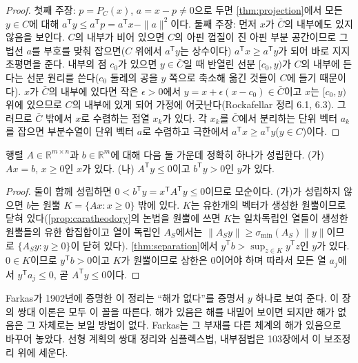 \begin{proof}
첫째 주장: $p=P_C(x)$, $a=x-p\ne0$으로 두면 \cref{thm:projection}에서 모든 $y\in C$에 대해 $a^{\mathsf T}y\le a^{\mathsf T}p=a^{\mathsf T}x-\|a\|^2$이다. 둘째 주장: 먼저 $x$가 $\bar C$의 내부에도 있지 않음을 보인다. $C$의 내부가 비어 있으면 $C$의 아핀 껍질이 진 아핀 부분 공간이므로 그 법선 $a$를 부호를 맞춰 잡으면($C$ 위에서 $a^{\mathsf T}y$는 상수이다) $a^{\mathsf T}x\ge a^{\mathsf T}y$가 되어 바로 지지 초평면을 준다. 내부의 점 $c_0$가 있으면 $y\in\bar C$일 때 반열린 선분 $[c_0,y)$가 $C$의 내부에 든다는 선분 원리를 쓴다($c_0$ 둘레의 공을 $y$ 쪽으로 축소해 옮긴 것들이 $C$에 들기 때문이다). $x$가 $\bar C$의 내부에 있다면 작은 $\epsilon>0$에서 $y=x+\epsilon(x-c_0)\in\bar C$이고 $x$는 $[c_0,y)$ 위에 있으므로 $C$의 내부에 있게 되어 가정에 어긋난다(Rockafellar\cite{rockafellar1970} 정리 6.1, 6.3). 그러므로 $\bar C$ 밖에서 $x$로 수렴하는 점열 $x_k$가 있다. 각 $x_k$를 $\bar C$에서 분리하는 단위 벡터 $a_k$를 잡으면 부분수열이 단위 벡터 $a$로 수렴하고 극한에서 $a^{\mathsf T}x\ge a^{\mathsf T}y$($y\in C$)이다.
\end{proof}

\begin{lemma}[Farkas]
\label{lem:farkas}
행렬 $A\in\mathbb R^{m\times n}$과 $b\in\mathbb R^m$에 대해 다음 둘 가운데 정확히 하나가 성립한다. (가) $Ax=b$, $x\ge0$인 $x$가 있다. (나) $A^{\mathsf T}y\le0$이고 $b^{\mathsf T}y>0$인 $y$가 있다.
\end{lemma}

\begin{proof}
둘이 함께 성립하면 $0<b^{\mathsf T}y=x^{\mathsf T}A^{\mathsf T}y\le0$이므로 모순이다. (가)가 성립하지 않으면 $b$는 원뿔 $K=\{Ax:x\ge0\}$ 밖에 있다. $K$는 유한개의 벡터가 생성한 원뿔이므로 닫혀 있다(\cref{prop:caratheodory}의 논법을 원뿔에 쓰면 $K$는 일차독립인 열들이 생성한 원뿔들의 유한 합집합이고 열이 독립인 $A_S$에서는 $\|A_Sy\|\ge\sigma_{\min}(A_S)\|y\|$이므로 $\{A_Sy:y\ge0\}$이 닫혀 있다). \cref{thm:separation}에서 $y^{\mathsf T}b>\sup_{z\in K}y^{\mathsf T}z$인 $y$가 있다. $0\in K$이므로 $y^{\mathsf T}b>0$이고 $K$가 원뿔이므로 상한은 $0$이어야 하며 따라서 모든 열 $a_j$에서 $y^{\mathsf T}a_j\le0$, 곧 $A^{\mathsf T}y\le0$이다.
\end{proof}

Farkas가 1902년에 증명한 이 정리\cite{farkas1902}는 ``해가 없다''를 증명서 $y$ 하나로 보여 준다. 이 장의 쌍대 이론은 모두 이 꼴을 따른다. 해가 있음은 해를 내밀어 보이면 되지만 해가 없음은 그 자체로는 보일 방법이 없다. Farkas는 그 부재를 다른 체계의 해가 있음으로 바꾸어 놓았다. 선형 계획의 쌍대 정리와 심플렉스법, 내부점법은 103장에서 이 보조정리 위에 세운다.

